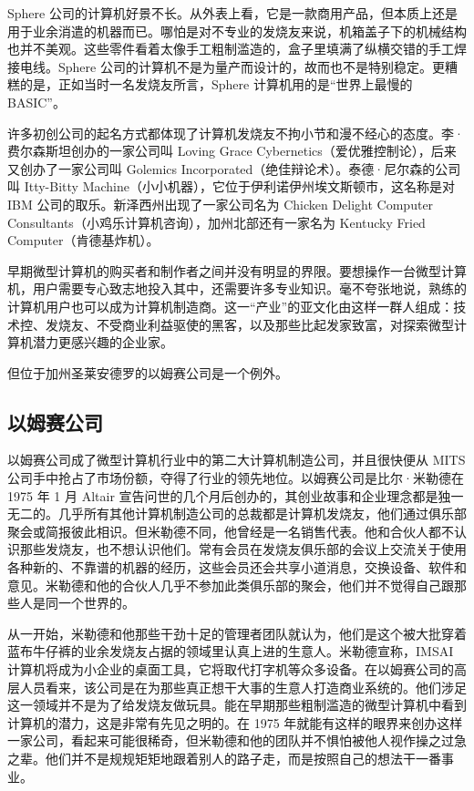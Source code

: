 \documentclass[12pt,UTF8]{ctexbook}
\begin{document}
Sphere 公司的计算机好景不长。从外表上看，它是一款商用产品，但本质上还是用于业余消遣的机器而已。哪怕是对不专业的发烧友来说，机箱盖子下的机械结构也并不美观。这些零件看着太像手工粗制滥造的，盒子里填满了纵横交错的手工焊接电线。Sphere 公司的计算机不是为量产而设计的，故而也不是特别稳定。更糟糕的是，正如当时一名发烧友所言，Sphere 计算机用的是“世界上最慢的 BASIC”。

许多初创公司的起名方式都体现了计算机发烧友不拘小节和漫不经心的态度。李·费尔森斯坦创办的一家公司叫 Loving Grace Cybernetics（爱优雅控制论），后来又创办了一家公司叫 Golemics Incorporated（绝佳辩论术）。泰德·尼尔森的公司叫 Itty-Bitty Machine（小小机器），它位于伊利诺伊州埃文斯顿市，这名称是对 IBM 公司的取乐。新泽西州出现了一家公司名为 Chicken Delight Computer Consultants（小鸡乐计算机咨询），加州北部还有一家名为 Kentucky Fried Computer（肯德基炸机）。

早期微型计算机的购买者和制作者之间并没有明显的界限。要想操作一台微型计算机，用户需要专心致志地投入其中，还需要许多专业知识。毫不夸张地说，熟练的计算机用户也可以成为计算机制造商。这一“产业”的亚文化由这样一群人组成：技术控、发烧友、不受商业利益驱使的黑客，以及那些比起发家致富，对探索微型计算机潜力更感兴趣的企业家。

但位于加州圣莱安德罗的以姆赛公司是一个例外。





\subsection{以姆赛公司}


以姆赛公司成了微型计算机行业中的第二大计算机制造公司，并且很快便从 MITS 公司手中抢占了市场份额，夺得了行业的领先地位。以姆赛公司是比尔·米勒德在 1975 年 1 月 Altair 宣告问世的几个月后创办的，其创业故事和企业理念都是独一无二的。几乎所有其他计算机制造公司的总裁都是计算机发烧友，他们通过俱乐部聚会或简报彼此相识。但米勒德不同，他曾经是一名销售代表。他和合伙人都不认识那些发烧友，也不想认识他们。常有会员在发烧友俱乐部的会议上交流关于使用各种新的、不靠谱的机器的经历，这些会员还会共享小道消息，交换设备、软件和意见。米勒德和他的合伙人几乎不参加此类俱乐部的聚会，他们并不觉得自己跟那些人是同一个世界的。

从一开始，米勒德和他那些干劲十足的管理者团队就认为，他们是这个被大批穿着蓝布牛仔裤的业余发烧友占据的领域里认真上进的生意人。米勒德宣称，IMSAI 计算机将成为小企业的桌面工具，它将取代打字机等众多设备。在以姆赛公司的高层人员看来，该公司是在为那些真正想干大事的生意人打造商业系统的。他们涉足这一领域并不是为了给发烧友做玩具。能在早期那些粗制滥造的微型计算机中看到计算机的潜力，这是非常有先见之明的。在 1975 年就能有这样的眼界来创办这样一家公司，看起来可能很稀奇，但米勒德和他的团队并不惧怕被他人视作操之过急之辈。他们并不是规规矩矩地跟着别人的路子走，而是按照自己的想法干一番事业。
\end{document}
